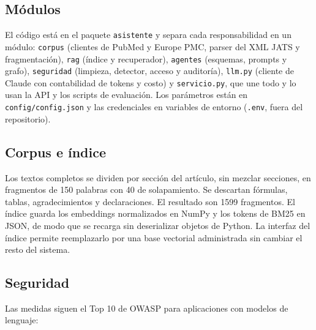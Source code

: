\documentclass[11pt,a4paper]{article}
\begin{document}
\subsection{Módulos}

El código está en el paquete \texttt{asistente} y separa cada responsabilidad en un módulo:
\texttt{corpus} (clientes de PubMed y Europe PMC, parser del XML JATS y fragmentación),
\texttt{rag} (índice y recuperador), \texttt{agentes} (esquemas, prompts y grafo),
\texttt{seguridad} (limpieza, detector, acceso y auditoría), \texttt{llm.py} (cliente de Claude con
contabilidad de tokens y costo) y \texttt{servicio.py}, que une todo y lo usan la API y los scripts
de evaluación. Los parámetros están en \texttt{config/config.json} y las credenciales en variables de
entorno (\texttt{.env}, fuera del repositorio).

\subsection{Corpus e índice}

Los textos completos se dividen por sección del artículo, sin mezclar secciones, en fragmentos de
150 palabras con 40 de solapamiento. Se descartan fórmulas, tablas, agradecimientos y declaraciones.
El resultado son 1599 fragmentos. El índice guarda los embeddings normalizados en NumPy y los tokens
de BM25 en JSON, de modo que se recarga sin deserializar objetos de Python. La interfaz del índice
permite reemplazarlo por una base vectorial administrada sin cambiar el resto del sistema.

\subsection{Seguridad}

Las medidas siguen el Top 10 de OWASP para aplicaciones con modelos de lenguaje:
\end{document}
